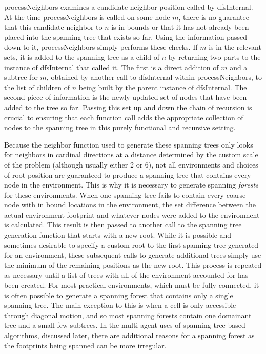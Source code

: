 processNeighbors examines a candidate neighbor position called by dfsInternal. At the time processNeighbors is called on some node $m$, there is no guarantee that this candidate neighbor to $n$ is in bounds or that it has not already been placed into the spanning tree that exists so far. Using the information passed down to it, processNeighbors simply performs these checks. If $m$ is in the relevant sets, it is added to the spanning tree as a child of $n$ by returning two parts to the instance of dfsInternal that called it. The first is a direct addition of $m$ and a subtree for $m$, obtained by another call to dfsInternal within processNeighbors, to the list of children of $n$ being built by the parent instance of dfsInternal. The second piece of information is the newly updated set of nodes that have been added to the tree so far. Passing this set up and down the chain of recursion is crucial to ensuring that each function call adds the appropriate collection of nodes to the spanning tree in this purely functional and recursive setting.

Because the neighbor function used to generate these spanning trees only looks for neighbors in cardinal directions at a distance determined by the custom scale of the problem (although usually either 2 or 6), not all environments and choices of root position are guaranteed to produce a spanning tree that contains every node in the environment. This is why it is necessary to generate spanning \textit{forests} for these environments. When one spanning tree fails to contain every coarse node with in bound locations in the environment, the set difference between the actual environment footprint and whatever nodes were added to the environment is calculated. This result is then passed to another call to the spanning tree generation function that starts with a new root. While it is possible and sometimes desirable to specify a custom root to the first spanning tree generated for an environment, these subsequent calls to generate additional trees simply use the minimum of the remaining positions as the new root. This process is repeated as necessary until a list of trees with all of the environment accounted for has been created. For most practical environments, which must be fully connected, it is often possible to generate a spanning forest that contains only a single spanning tree. The main exception to this is when a cell is only accessible through diagonal motion, and so most spanning forests contain one domainant tree and a small few subtrees. In the multi agent uses of spanning tree based algorithms, discussed later, there are additional reasons for a spanning forest as the footprints being spanned can be more irregular.

